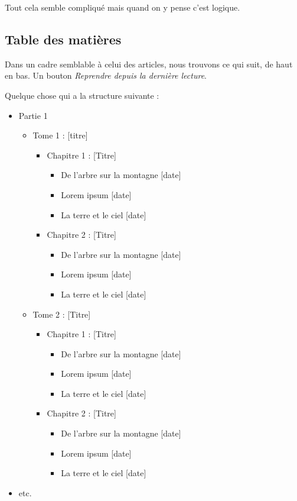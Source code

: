 \documentclass[french]{report}
\theoremstyle{plain}
\begin{document}
			Tout cela semble compliqué mais quand on y pense c'est logique.

		\subsection{Table des matières} \label{toc}

			Dans un cadre semblable à celui des articles, nous trouvons ce qui suit, de haut en bas.
			Un bouton \emph{Reprendre depuis la dernière lecture}.

			Quelque chose qui a la structure suivante :
			\begin{itemize}
				\item Partie 1
				\begin{itemize}
					\item Tome 1 : [titre]
					\begin{itemize}
						\item Chapitre 1 : [Titre]
						\begin{itemize}
							\item De l'arbre sur la montagne [date]
							\item Lorem ipsum [date]
							\item La terre et le ciel [date]
						\end{itemize}
						\item Chapitre 2 : [Titre]
						\begin{itemize}
							\item De l'arbre sur la montagne [date]
							\item Lorem ipsum [date]
							\item La terre et le ciel [date]
						\end{itemize}
					\end{itemize}
					\item Tome 2 : [Titre]
					\begin{itemize}
						\item Chapitre 1 : [Titre]
						\begin{itemize}
							\item De l'arbre sur la montagne [date]
							\item Lorem ipsum [date]
							\item La terre et le ciel [date]
						\end{itemize}
						\item Chapitre 2 : [Titre]
						\begin{itemize}
							\item De l'arbre sur la montagne [date]
							\item Lorem ipsum [date]
							\item La terre et le ciel [date]
						\end{itemize}
					\end{itemize}
				\end{itemize}
				\item etc.
			\end{itemize}
\end{document}
